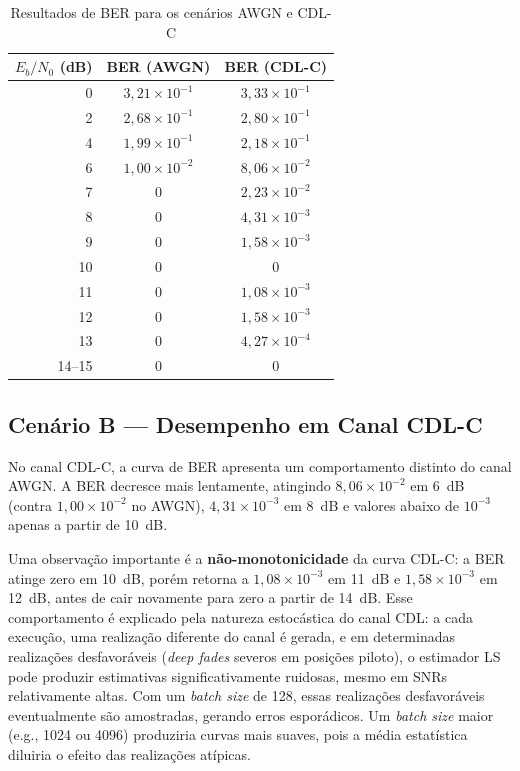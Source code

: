 \documentclass[conference]{IEEEtran}
\begin{document}
\begin{table}[htbp]
\centering
\caption{Resultados de BER para os cenários AWGN e CDL-C}
\label{tab:ber_results}
\begin{tabular}{@{}rcc@{}}
\toprule
$E_b/N_0$ (dB) & BER (AWGN) & BER (CDL-C) \\
\midrule
0  & $3{,}21 \times 10^{-1}$ & $3{,}33 \times 10^{-1}$ \\
2  & $2{,}68 \times 10^{-1}$ & $2{,}80 \times 10^{-1}$ \\
4  & $1{,}99 \times 10^{-1}$ & $2{,}18 \times 10^{-1}$ \\
6  & $1{,}00 \times 10^{-2}$ & $8{,}06 \times 10^{-2}$ \\
7  & $0$ & $2{,}23 \times 10^{-2}$ \\
8  & $0$ & $4{,}31 \times 10^{-3}$ \\
9  & $0$ & $1{,}58 \times 10^{-3}$ \\
10 & $0$ & $0$ \\
11 & $0$ & $1{,}08 \times 10^{-3}$ \\
12 & $0$ & $1{,}58 \times 10^{-3}$ \\
13 & $0$ & $4{,}27 \times 10^{-4}$ \\
14--15 & $0$ & $0$ \\
\bottomrule
\end{tabular}
\end{table}

\subsection{Cenário B --- Desempenho em Canal CDL-C}

No canal CDL-C, a curva de BER apresenta um comportamento distinto do canal AWGN. A BER decresce mais lentamente, atingindo $8{,}06 \times 10^{-2}$ em 6~dB (contra $1{,}00 \times 10^{-2}$ no AWGN), $4{,}31 \times 10^{-3}$ em 8~dB e valores abaixo de $10^{-3}$ apenas a partir de 10~dB.

Uma observação importante é a \textbf{não-monotonicidade} da curva CDL-C: a BER atinge zero em 10~dB, porém retorna a $1{,}08 \times 10^{-3}$ em 11~dB e $1{,}58 \times 10^{-3}$ em 12~dB, antes de cair novamente para zero a partir de 14~dB. Esse comportamento é explicado pela natureza estocástica do canal CDL: a cada execução, uma realização diferente do canal é gerada, e em determinadas realizações desfavoráveis (\textit{deep fades} severos em posições piloto), o estimador LS pode produzir estimativas significativamente ruidosas, mesmo em SNRs relativamente altas. Com um \textit{batch size} de 128, essas realizações desfavoráveis eventualmente são amostradas, gerando erros esporádicos. Um \textit{batch size} maior (e.g., 1024 ou 4096) produziria curvas mais suaves, pois a média estatística diluiria o efeito das realizações atípicas.
\end{document}
